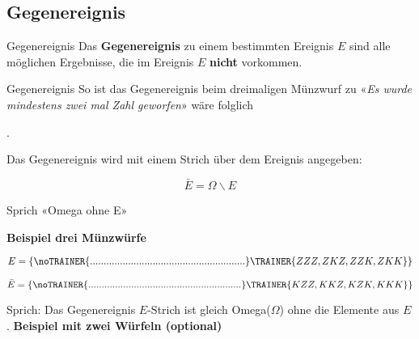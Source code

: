 \subsection{Gegenereignis}

\begin{definition}{Gegenereignis}{}
  Das \textbf{Gegenereignis} zu einem bestimmten Ereignis $E$ sind alle möglichen Ergebnisse,
  die im Ereignis $E$ \textbf{nicht} vorkommen.
\end{definition}

\begin{beispiel}{Gegenereignis}{}
So ist das Gegenereignis beim dreimaligen Münzwurf zu «\textit{Es wurde mindestens zwei mal Zahl
geworfen}» wäre folglich

\vspace{3mm}
.
\end{beispiel}

\vspace{2mm}


\begin{definition}{}{}
Das Gegenereignis wird mit einem Strich über dem Ereignis angegeben:

$$\bar{E} = \Omega \backslash E$$

Sprich «Omega ohne E»
\end{definition}

\newpage
\textbf{Beispiel drei Münzwürfe}


$$E = \{
\noTRAINER{.........................................................}\TRAINER{ZZZ,
ZKZ, ZZK, ZKK\}}$$

$$\bar{E} = \{
\noTRAINER{.........................................................}\TRAINER{KZZ,
KKZ, KZK, KKK\}}$$


Sprich: Das Gegenereignis $E$-Strich ist gleich Omega($\Omega$) ohne die Elemente
aus $E$.
\newpage
\textbf{Beispiel mit zwei Würfeln (optional)}



